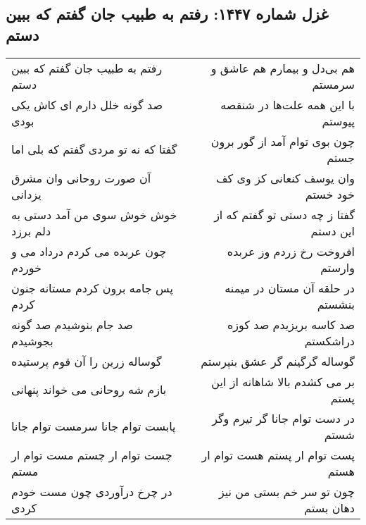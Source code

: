 \begin{center}
\section*{غزل شماره ۱۴۴۷: رفتم به طبیب جان گفتم که ببین دستم}
\label{sec:1447}
\begin{longtable}{l p{0.5cm} r}
رفتم به طبیب جان گفتم که ببین دستم
&&
هم بی‌دل و بیمارم هم عاشق و سرمستم
\\
صد گونه خلل دارم ای کاش یکی بودی
&&
با این همه علت‌ها در شنقصه پیوستم
\\
گفتا که نه تو مردی گفتم که بلی اما
&&
چون بوی توام آمد از گور برون جستم
\\
آن صورت روحانی وان مشرق یزدانی
&&
وان یوسف کنعانی کز وی کف خود خستم
\\
خوش خوش سوی من آمد دستی به دلم برزد
&&
گفتا ز چه دستی تو گفتم که از این دستم
\\
چون عربده می کردم درداد می و خوردم
&&
افروخت رخ زردم وز عربده وارستم
\\
پس جامه برون کردم مستانه جنون کردم
&&
در حلقه آن مستان در میمنه بنشستم
\\
صد جام بنوشیدم صد گونه بجوشیدم
&&
صد کاسه بریزیدم صد کوزه دراشکستم
\\
گوساله زرین را آن قوم پرستیده
&&
گوساله گرگینم گر عشق بنپرستم
\\
بازم شه روحانی می خواند پنهانی
&&
بر می کشدم بالا شاهانه از این پستم
\\
پابست توام جانا سرمست توام جانا
&&
در دست توام جانا گر تیرم وگر شستم
\\
چست توام ار چستم مست توام ار مستم
&&
پست توام ار پستم هست توام ار هستم
\\
در چرخ درآوردی چون مست خودم کردی
&&
چون تو سر خم بستی من نیز دهان بستم
\\
\end{longtable}
\end{center}
